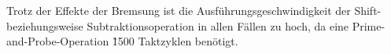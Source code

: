 Trotz der Effekte der Bremsung ist die Ausführungsgeschwindigkeit der Shift- beziehungsweise Subtraktionsoperation in allen Fällen zu hoch, da eine Prime-and-Probe-Operation \~1500 Taktzyklen benötigt.









